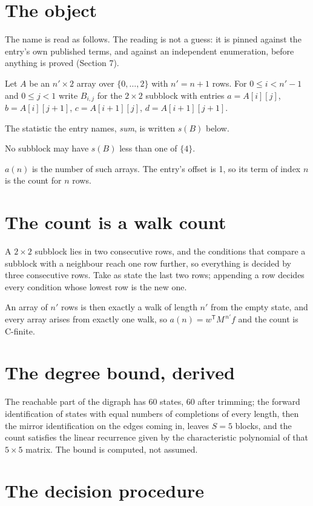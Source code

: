 \documentclass[11pt]{article}
\theoremstyle{definition}
\begin{document}
\section{The object}

The name is read as follows. The reading is not a guess: it is pinned against the entry's own published terms, and against an independent enumeration, before anything is proved (Section 7).

Let $A$ be an $n' \times 2$ array over $\{0,\dots,2\}$ with $n' = n + 1$ rows. For $0 \le i < n'-1$ and $0 \le j < 1$ write $B_{i,j}$ for the $2\times2$ subblock with entries $a = A[i][j]$, $b = A[i][j{+}1]$, $c = A[i{+}1][j]$, $d = A[i{+}1][j{+}1]$.

The statistic the entry names, {\itshape sum}, is written $s(B)$ below.

No subblock may have $s(B)$ less than one of $\{4\}$.

$a(n)$ is the number of such arrays. The entry's offset is 1, so its term of index $n$ is the count for $n$ rows.

\section{The count is a walk count}

A $2\times2$ subblock lies in two consecutive rows, and the conditions that compare a subblock with a neighbour reach one row further, so everything is decided by three consecutive rows. Take as state the last two rows; appending a row decides every condition whose lowest row is the new one.

An array of $n'$ rows is then exactly a walk of length $n'$ from the empty state, and every array arises from exactly one walk, so $a(n) = w^{\mathsf T}M^{\,n'}f$ and the count is C-finite.

\section{The degree bound, derived}

The reachable part of the digraph has $60$ states, $60$ after trimming; the forward identification of states with equal numbers of completions of every length, then the mirror identification on the edges coming in, leaves $S = 5$ blocks, and the count satisfies the linear recurrence given by the characteristic polynomial of that $5\times5$ matrix. The bound is computed, not assumed.

\section{The decision procedure}
\end{document}
